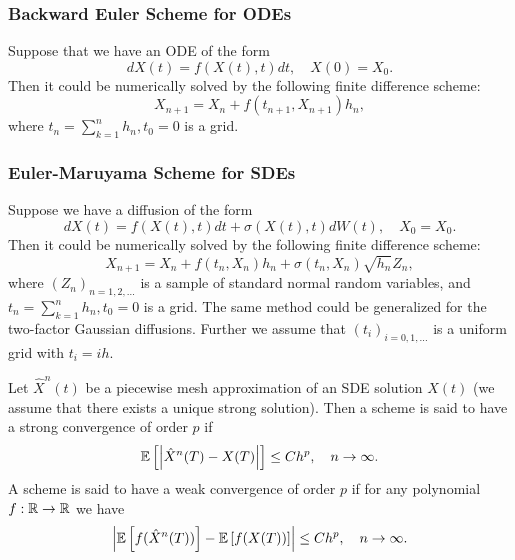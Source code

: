             \subsubsection{Backward Euler Scheme for ODEs}
                Suppose that we have an ODE of the form
                \begin{equation}
                    dX(t) = f(X(t), t)dt, \quad X(0) = X_0. \label{eq:ode2}
                \end{equation}
                Then it could be numerically solved by the following finite difference scheme:
                \begin{equation}
                    X_{n+1} = X_n + f(t_{n+1}, X_{n+1})h_n, \label{Backward:Euler:ODE}
                \end{equation}
                where $t_n = \sum_{k=1}^n h_n, t_0 = 0$ is a grid.

            \subsubsection{Euler-Maruyama Scheme for SDEs}
                Suppose we have a diffusion of the form 
                \begin{equation*}
                    dX(t) = f(X(t), t)dt + \sigma(X(t), t)dW(t), \quad X_0 = X_0.
                \end{equation*}
                Then it could be numerically solved by the following finite difference scheme:
                \begin{equation}
                    X_{n+1} = X_n + f(t_n, X_n)h_n + \sigma(t_n, X_n) \sqrt{h_n} Z_n, \label{Euler:SDE}
                \end{equation}
                where $(Z_n)_{n=1, 2, \dots}$ is a sample of standard normal random variables, and $t_n = \sum_{k=1}^n h_n, t_0 = 0$ is a grid.
                The same method could be generalized for the two-factor Gaussian diffusions. Further we assume
                that $(t_i)_{i = 0, 1, \dots}$ is a uniform grid with $t_i = ih$.

                \begin{definition}
                    Let $\hat X^n(t)$ be a piecewise mesh approximation of an SDE solution $X(t)$ (we assume that there exists a unique strong solution). 
                    Then a scheme is said to have a strong convergence of order $p$ if 
                    \begin{equation}
                        \mathbb{E}\left[\left|\hat X^n(T) - X(T)\right|\right] \leq Ch^p, \quad n \to \infty.
                    \end{equation}
                    A scheme is said to have a weak convergence of order $p$ if for any polynomial $f: \mathbb{R} \to \mathbb{R}$ we have
                    \begin{equation}
                        \left|\mathbb{E}\left[f(\hat X^n(T))\right] - \mathbb{E}\left[f(X(T))\right]\right| \leq Ch^p, \quad n \to \infty.
                    \end{equation}
                \end{definition}

